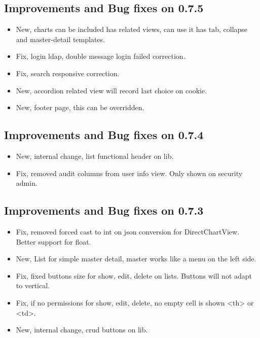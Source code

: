 \documentclass[letterpaper,10pt,english]{sphinxmanual}
\begin{document}
\subsection{Improvements and Bug fixes on 0.7.5}
\label{versions:improvements-and-bug-fixes-on-0-7-5}\begin{itemize}
\item {} 
New, charts can be included has related views, can use it has tab, collapse and master-detail templates.

\item {} 
Fix, login ldap, double message login failed correction.

\item {} 
Fix, search responsive correction.

\item {} 
New, accordion related view will record last choice on cookie.

\item {} 
New, footer page, this can be overridden.

\end{itemize}


\subsection{Improvements and Bug fixes on 0.7.4}
\label{versions:improvements-and-bug-fixes-on-0-7-4}\begin{itemize}
\item {} 
New, internal change, list functional header on lib.

\item {} 
Fix, removed audit columns from user info view. Only shown on security admin.

\end{itemize}


\subsection{Improvements and Bug fixes on 0.7.3}
\label{versions:improvements-and-bug-fixes-on-0-7-3}\begin{itemize}
\item {} 
Fix, removed forced cast to int on json conversion for DirectChartView. Better support for float.

\item {} 
New, List for simple master detail, master works like a menu on the left side.

\item {} 
Fix, fixed buttons size for show, edit, delete on lists. Buttons will not adapt to vertical.

\item {} 
Fix, if no permissions for show, edit, delete, no empty cell is shown \textless{}th\textgreater{} or \textless{}td\textgreater{}.

\item {} 
New, internal change, crud buttons on lib.

\end{itemize}
\end{document}
